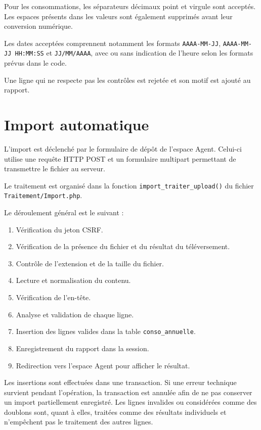 Pour les consommations, les séparateurs décimaux point et virgule sont acceptés. Les espaces présents dans les valeurs sont également supprimés avant leur conversion numérique.

Les dates acceptées comprennent notamment les formats \texttt{AAAA-MM-JJ}, \texttt{AAAA-MM-JJ HH:MM:SS} et \texttt{JJ/MM/AAAA}, avec ou sans indication de l'heure selon les formats prévus dans le code.

Une ligne qui ne respecte pas les contrôles est rejetée et son motif est ajouté au rapport.

\section{Import automatique}

L'import est déclenché par le formulaire de dépôt de l'espace Agent. Celui-ci utilise une requête HTTP POST et un formulaire multipart permettant de transmettre le fichier au serveur.

Le traitement est organisé dans la fonction \texttt{import\_traiter\_upload()} du fichier \texttt{Traitement/Import.php}.

Le déroulement général est le suivant :

\begin{enumerate}
    \item Vérification du jeton CSRF.
    \item Vérification de la présence du fichier et du résultat du téléversement.
    \item Contrôle de l'extension et de la taille du fichier.
    \item Lecture et normalisation du contenu.
    \item Vérification de l'en-tête.
    \item Analyse et validation de chaque ligne.
    \item Insertion des lignes valides dans la table \texttt{conso\_annuelle}.
    \item Enregistrement du rapport dans la session.
    \item Redirection vers l'espace Agent pour afficher le résultat.
\end{enumerate}

Les insertions sont effectuées dans une transaction. Si une erreur technique survient pendant l'opération, la transaction est annulée afin de ne pas conserver un import partiellement enregistré. Les lignes invalides ou considérées comme des doublons sont, quant à elles, traitées comme des résultats individuels et n'empêchent pas le traitement des autres lignes.

